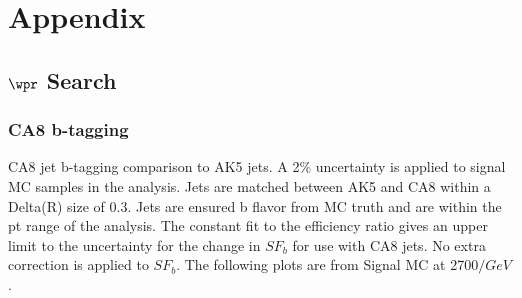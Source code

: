 \chapter{Appendix}
\label{sec:appendix}
\section{$\wpr$ Search}
\subsection{CA8 b-tagging}
\label{sec:ca8toak5}


CA8 jet b-tagging comparison to AK5 jets. A 2\% uncertainty is applied to signal MC samples in the analysis.  Jets are matched between AK5 and CA8 
within a Delta(R) size of 0.3.
Jets are ensured b flavor from MC truth and are within the pt range of the analysis.  The constant fit to the efficiency ratio gives an upper limit to the uncertainty 
for the change in $SF_b$ for use with CA8 jets.  No extra correction is applied to $SF_b$.  The following plots are from Signal MC at 2700$/GeV$. 

